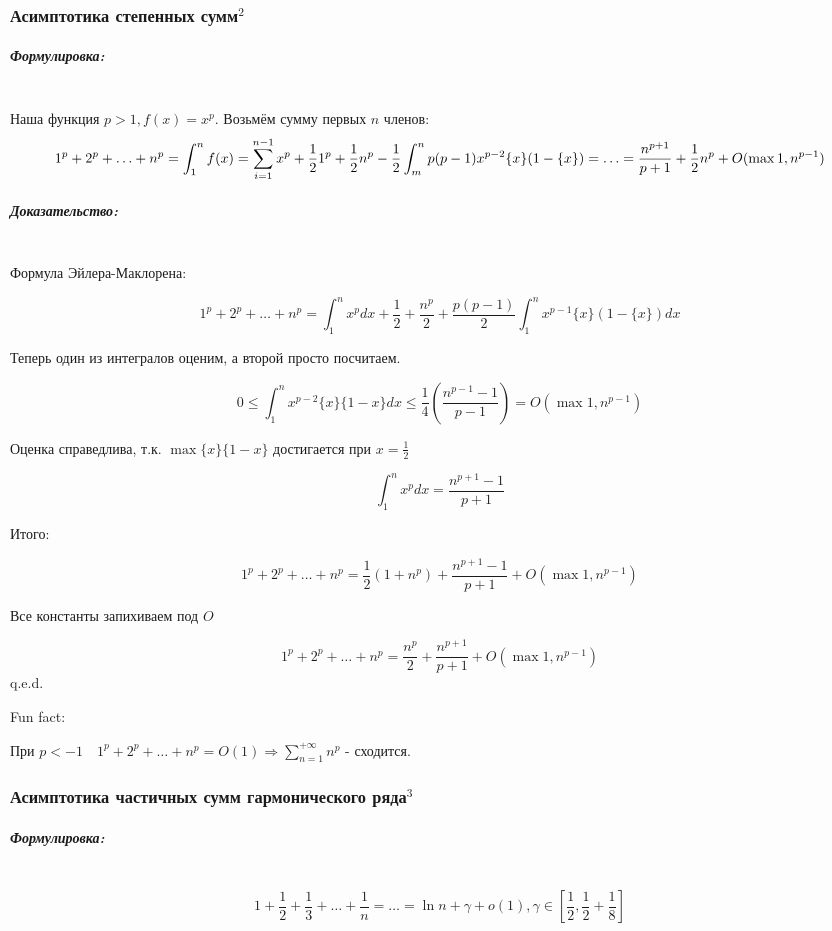 \documentclass{article}
\let\vanillasubparagraph\subparagraph
\renewcommand{\subparagraph}[1]{\vanillasubparagraph{#1}\mbox{}\\}
\begin{document}
\subsubsection{Асимптотика степенных сумм\texorpdfstring{$^2$}{}}
\subparagraph{Формулировка:}

Наша функция $p > 1, f(x) = x^p$. Возьмём сумму первых $n$ членов:
\[1^p + 2^p + \ldots + n^p = \int_1^n{f(x)} = \sum_{i = 1}^{n - 1}{x^p} + \frac{1}{2}1^p + \frac{1}{2}n^p - \frac{1}{2}\int_m^n{p(p - 1)x^{p - 2}\{x\}(1 - \{x\})} \\= \ldots = \frac{n^{p + 1}}{p + 1} + \frac{1}{2}n^p + O(\max{1, n^{p - 1}})\]

\subparagraph{Доказательство:}

Формула Эйлера-Маклорена:

$$
1^p + 2^p + \ldots + n^p = \int_1^n x^p dx + \frac{1}{2} + \frac{n^p}{2} + \frac{p(p-1)}{2}\int_1^n x^{p-1}\{x\}(1 - \{x\})dx
$$

Теперь один из интегралов оценим, а второй просто посчитаем.

$$
0 \leq \int_1^n x^{p-2} \{x\}\{1 - x\} dx \leq \frac{1}{4} \left(\frac{n^{p-1} - 1}{p - 1}\right) = O\left(\max{1, n^{p-1}}\right)
$$

Оценка справедлива, т.к. $\max{\{x\}\{1 - x\} }$ достигается при $x = \frac{1}{2}$

$$
\int_1^n x^p dx = \frac{n^{p+1} - 1}{p + 1}
$$

Итого:

$$
1^p + 2^p + \ldots + n^p = \frac{1}{2}(1 + n^p) + \frac{n^{p + 1} - 1} {p + 1} + O(\max 1, n^{p-1}) 
$$

Все константы запихиваем под $O$

$$
1^p + 2^p + \ldots + n^p = \frac{n^p}{2} + \frac{n^{p + 1}}{p + 1} + O(\max 1, n^{p-1})
$$
q.e.d.

Fun fact: 

При $p < -1 \quad 1^p + 2^p + \ldots + n^p = O(1) \Rightarrow \sum_{n=1}^{+\infty} n^p$ - сходится.



\subsubsection{Асимптотика частичных сумм гармонического ряда\texorpdfstring{$^3$}{}}

\subparagraph{Формулировка:}

\[1 + \frac{1}{2} + \frac{1}{3} + \ldots + \frac{1}{n} = \ldots = \ln{n} + \gamma + o(1), \gamma \in \left[\frac{1}{2}, \frac{1}{2} + \frac{1}{8}\right]\]
\end{document}
